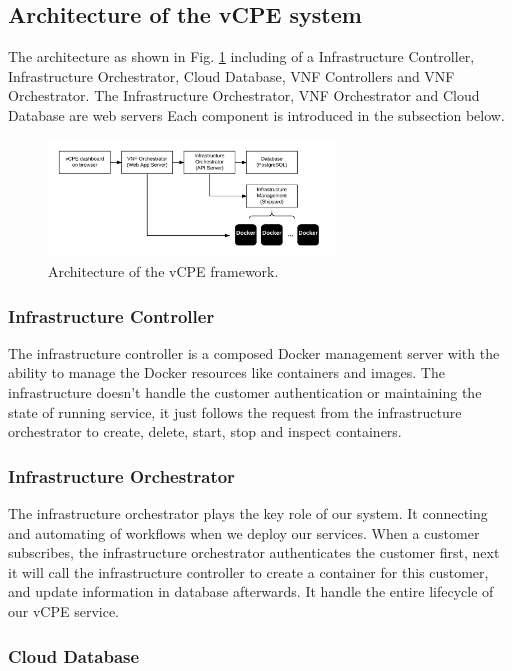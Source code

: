 \documentclass[journal]{IEEEtran}
\begin{document}
\subsection{Architecture of the vCPE system}
The architecture as shown in Fig. \ref{fig:desc_vcpe_framework} including of a Infrastructure Controller, Infrastructure Orchestrator, Cloud Database, VNF Controllers and VNF Orchestrator.
The Infrastructure Orchestrator, VNF Orchestrator and Cloud Database are web servers
Each component is introduced in the subsection below.

\begin{figure}[!t]
\centering
\includegraphics[width=3in]{./figures/desc_vcpe_framework}
\caption{Architecture of the vCPE framework.}
\label{fig:desc_vcpe_framework}
\end{figure}

\subsubsection{Infrastructure Controller}

The infrastructure controller is a composed Docker management server with the ability to manage the Docker resources like containers and images. The infrastructure doesn't handle the customer authentication or maintaining the state of running service, it just follows the request from the infrastructure orchestrator to create, delete, start, stop and inspect containers.

\subsubsection{Infrastructure Orchestrator}

The infrastructure orchestrator plays the key role of our system. It connecting and automating of workflows when we deploy our services. When a customer subscribes, the infrastructure orchestrator authenticates the customer first, next it will call the infrastructure controller to create a container for this customer, and update information in database afterwards. It handle the entire lifecycle of our vCPE service.

\subsubsection{Cloud Database}
\end{document}

